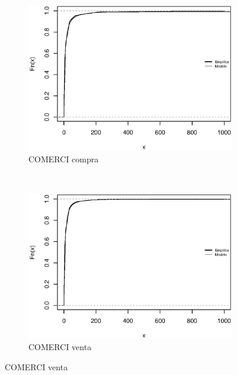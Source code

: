 \documentclass[11pt]{article}
\numberwithin{equation}{section} %
\begin{document}
\begin{figure}[htbp]
\begin{subfigure}[b]{0.5\textwidth}
\centering
\includegraphics[width=\textwidth, trim=0 0.5cm 0 1cm]{comercicompra.eps}
\caption{COMERCI compra}
\label{fig:comercicompra}
\end{subfigure}%
~ %
\begin{subfigure}[b]{0.5\textwidth}
\centering
\includegraphics[width=\textwidth, trim=0 0.5cm 0 1cm]{comerciventa.eps}
\caption{COMERCI venta}
\label{fig:comerciventa}
\end{subfigure}


\end{figure}
\end{document}

